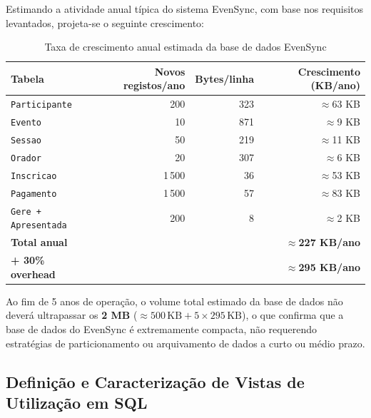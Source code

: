 \documentclass[runningheads]{llncs}
\begin{document}
                Estimando a atividade anual típica do sistema EvenSync, com base nos requisitos
                levantados, projeta-se o seguinte crescimento:

                \begin{table}[H]
                \centering
                \renewcommand{\arraystretch}{1.3}
                \begin{tabular}{|l|r|r|r|}
                \hline
                \textbf{Tabela} & \textbf{Novos registos/ano} & \textbf{Bytes/linha} & \textbf{Crescimento (KB/ano)} \\ \hline
                \texttt{Participante}  & 200   & 323 & $\approx$63 KB \\ \hline
                \texttt{Evento}        & 10    & 871 & $\approx$9 KB \\ \hline
                \texttt{Sessao}        & 50    & 219 & $\approx$11 KB \\ \hline
                \texttt{Orador}        & 20    & 307 & $\approx$6 KB \\ \hline
                \texttt{Inscricao}     & 1\,500 & 36  & $\approx$53 KB \\ \hline
                \texttt{Pagamento}     & 1\,500 & 57  & $\approx$83 KB \\ \hline
                \texttt{Gere + Apresentada} & 200 & 8  & $\approx$2 KB \\ \hline
                \textbf{Total anual}   &       &    & $\approx$\textbf{227 KB/ano} \\ \hline
                \textbf{+ 30\% overhead} &     &    & $\approx$\textbf{295 KB/ano} \\ \hline
                \end{tabular}
                \vspace{0.2cm}
                \caption{Taxa de crescimento anual estimada da base de dados EvenSync} \label{tab:crescimento_bd}
                \end{table}

                Ao fim de 5 anos de operação, o volume total estimado da base de dados não deverá
                ultrapassar os \textbf{2 MB} ($\approx 500\,\text{KB} + 5 \times 295\,\text{KB}$),
                o que confirma que a base de dados do EvenSync é extremamente compacta, não
                requerendo estratégias de particionamento ou arquivamento de dados a curto ou médio
                prazo.

                \subsection{Definição e Caracterização de Vistas de Utilização em SQL}
\end{document}
